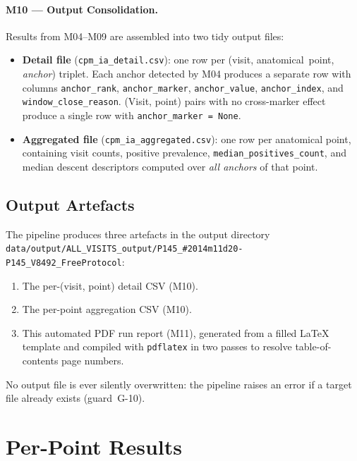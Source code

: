 \documentclass[a4paper,11pt]{article}
\begin{document}
\paragraph{M10 --- Output Consolidation.}
Results from M04--M09 are assembled into two tidy output files:
\begin{itemize}
  \item \textbf{Detail file} (\texttt{cpm\_ia\_detail.csv}): one row per
        (visit, anatomical~point, \emph{anchor}) triplet. Each anchor detected by M04
        produces a separate row with columns \texttt{anchor\_rank},
        \texttt{anchor\_marker}, \texttt{anchor\_value}, \texttt{anchor\_index},
        and \texttt{window\_close\_reason}.
        (Visit, point) pairs with no cross-marker effect produce a single row with
        \texttt{anchor\_marker = None}.
  \item \textbf{Aggregated file} (\texttt{cpm\_ia\_aggregated.csv}): one row per
        anatomical point, containing visit counts, positive prevalence,
        \texttt{median\_positives\_count}, and median descent descriptors computed over
        \emph{all anchors} of that point.
\end{itemize}

\subsection{Output Artefacts}

The pipeline produces three artefacts in the output directory \texttt{data/output/ALL\_VISITS\_output/P145\_\#2014m11d20-P145\_V8492\_FreeProtocol}:
\begin{enumerate}
  \item The per-(visit, point) detail CSV (M10).
  \item The per-point aggregation CSV (M10).
  \item This automated PDF run report (M11), generated from a filled \LaTeX{} template
        and compiled with \texttt{pdflatex} in two passes to resolve table-of-contents
        page numbers.
\end{enumerate}
No output file is ever silently overwritten: the pipeline raises an error if a target
file already exists (guard~G-10).

\section{Per-Point Results}
\end{document}
